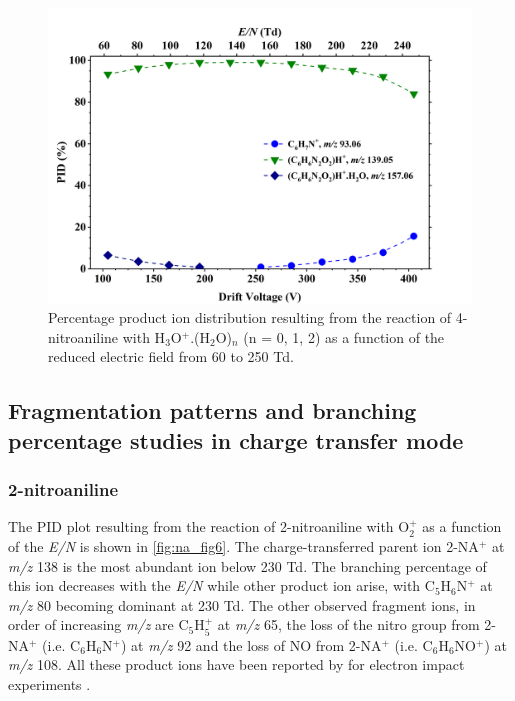 \begin{figure}%
\centering
\includegraphics[height=0.35\textheight]{pics/nitros_paper_5.png}
\caption{Percentage product ion distribution resulting from the reaction of 4-nitroaniline with H$_3$O$^+$.(H$_2$O)$_n$ (n = 0, 1, 2) as a function of the reduced electric field from 60 to 250 Td.}
\label{fig:na_fig5}
\end{figure}

\subsection{Fragmentation patterns and branching percentage studies in charge transfer mode}

\subsubsection{2-nitroaniline}
The PID plot resulting from the reaction of 2-nitroaniline with O$_2^+$ as a function of the \textit{E/N} is shown in  \autoref{fig:na_fig6}.
The charge-transferred parent ion 2-NA$^+$ at \textit{m/z} 138 is the most abundant ion below 230 Td.
The branching percentage of this ion decreases with the \textit{E/N} while other product ion arise, with C$_5$H$_6$N$^+$ at \textit{m/z} 80 becoming dominant at 230 Td. 
The other observed fragment ions, in order of increasing \textit{m/z} are C$_5$H$_5^+$ at \textit{m/z} 65, 
the loss of the nitro group from 2-NA$^+$ (i.e. C$_6$H$_6$N$^+$) at \textit{m/z} 92 and
the loss of NO from 2-NA$^+$ (i.e. C$_6$H$_6$NO$^+$) at \textit{m/z} 108.
All these product ions have been reported by \citeauthor{beynon1959some} for electron impact experiments   \cite{beynon1959some}.

